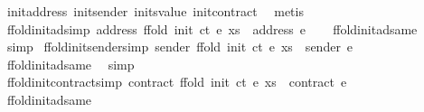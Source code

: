 \begin{isabellebody}
\ init{\isacharunderscore}{\kern0pt}address\ init{\isacharunderscore}{\kern0pt}sender\ init{\isacharunderscore}{\kern0pt}svalue\ init{\isacharunderscore}{\kern0pt}contract\ \isamarkupfalse%
\ metis\isanewline
\ \ \isamarkupfalse%
\isanewline
{}\isamarkupfalse%
%
\endisatagproof
{\isafoldproof}%
%
\isadelimproof
\isanewline
%
\endisadelimproof
\isanewline
{}\isamarkupfalse%
\ ffold{\isacharunderscore}{\kern0pt}init{\isacharunderscore}{\kern0pt}ad{\isacharbrackleft}{\kern0pt}simp{\isacharbrackright}{\kern0pt}{\isacharcolon}{\kern0pt}\ {\isachardoublequoteopen}address\ {\isacharparenleft}{\kern0pt}ffold\ {\isacharparenleft}{\kern0pt}init\ ct{\isacharparenright}{\kern0pt}\ e\ xs{\isacharparenright}{\kern0pt}\ {\isacharequal}{\kern0pt}\ address\ e{\isachardoublequoteclose}\isanewline
%
\isadelimproof
\ \ %
\endisadelimproof
%
\isatagproof
{}\isamarkupfalse%
\ ffold{\isacharunderscore}{\kern0pt}init{\isacharunderscore}{\kern0pt}ad{\isacharunderscore}{\kern0pt}same\ \isamarkupfalse%
\ simp%
\endisatagproof
{\isafoldproof}%
%
\isadelimproof
\isanewline
%
\endisadelimproof
\isanewline
{}\isamarkupfalse%
\ ffold{\isacharunderscore}{\kern0pt}init{\isacharunderscore}{\kern0pt}sender{\isacharbrackleft}{\kern0pt}simp{\isacharbrackright}{\kern0pt}{\isacharcolon}{\kern0pt}\ {\isachardoublequoteopen}sender\ {\isacharparenleft}{\kern0pt}ffold\ {\isacharparenleft}{\kern0pt}init\ ct{\isacharparenright}{\kern0pt}\ e\ xs{\isacharparenright}{\kern0pt}\ {\isacharequal}{\kern0pt}\ sender\ e{\isachardoublequoteclose}\isanewline
%
\isadelimproof
\ \ %
\endisadelimproof
%
\isatagproof
{}\isamarkupfalse%
\ ffold{\isacharunderscore}{\kern0pt}init{\isacharunderscore}{\kern0pt}ad{\isacharunderscore}{\kern0pt}same\ \isamarkupfalse%
\ simp%
\endisatagproof
{\isafoldproof}%
%
\isadelimproof
\isanewline
%
\endisadelimproof
\isanewline
{}\isamarkupfalse%
\ ffold{\isacharunderscore}{\kern0pt}init{\isacharunderscore}{\kern0pt}contract{\isacharbrackleft}{\kern0pt}simp{\isacharbrackright}{\kern0pt}{\isacharcolon}{\kern0pt}\ {\isachardoublequoteopen}contract\ {\isacharparenleft}{\kern0pt}ffold\ {\isacharparenleft}{\kern0pt}init\ ct{\isacharparenright}{\kern0pt}\ e\ xs{\isacharparenright}{\kern0pt}\ {\isacharequal}{\kern0pt}\ contract\ e{\isachardoublequoteclose}\isanewline
%
\isadelimproof
\ \ %
\endisadelimproof
%
\isatagproof
{}\isamarkupfalse%
\ ffold{\isacharunderscore}{\kern0pt}init{\isacharunderscore}{\kern0pt}ad{\isacharunderscore}{\kern0pt}same\ \isamarkupfalse%

\end{isabellebody}
